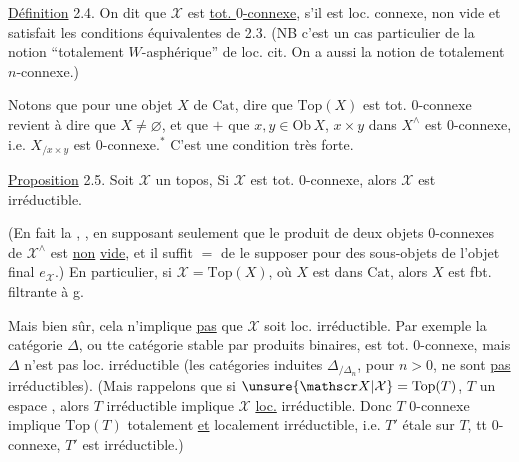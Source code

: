 
\uline{Définition} 2.4. On dit que $\mathscr X$ est \uline{tot. $0$-connexe}, s'il est  loc. connexe, non vide et satisfait les conditions équivalentes de 2.3. (NB c'est un cas particulier de la notion ``totalement $W$-asphérique'' de loc. cit. On a aussi la notion de totalement $n$-connexe.)

Notons que pour une  objet $X$ de $\mathrm{Cat}$, dire que $\mathrm{Top}(X)$ est tot. $0$-connexe revient à dire que $X\ne\varnothing$, et que $+$ que $x,y\in\mathrm{Ob}\,X$, $x\times y$ dans $X^{\wedge}$ est $0$-connexe, i.e. $X_{/x\times y}$ est $0$-connexe.$^{*}$ C'est une condition très forte.



\uline{Proposition} 2.5. Soit $\mathscr X$ un topos,  Si $\mathscr X$ est tot. $0$-connexe, alors $\mathscr X$ est irréductible. 

(En fait la  , , en supposant seulement que le produit de deux objets $0$-connexes de $\mathscr X^{\wedge}$ est \uline{non} \uline{vide}, et il suffit $=$ de le supposer pour des sous-objets de l'objet final $e_{\mathscr X}$.) En particulier, si $\mathscr X=\mathrm{Top}(X)$, où $X$ est dans $\mathrm{Cat}$, alors $X$ est fbt. filtrante à g.

Mais  bien sûr,  cela n'implique \uline{pas} que $\mathscr X$ soit loc. irréductible.
Par exemple la catégorie $\Delta$, ou tte  catégorie stable par produits binaires, est tot. $0$-connexe, mais $\Delta$ n'est pas loc.  irréductible (les catégories induites $\Delta_{/\Delta_n}$, pour $n>0$, ne sont  \uline{pas} irréductibles). (Mais rappelons que  si $\unsure{\mathscr X|\mathcal X}=\mathrm{Top}(T)$, $T$ un espace , alors $T$ irréductible implique $\mathscr X$ \uline{loc.} irréductible. Donc $T$  $0$-connexe implique $\mathrm{Top}(T)$ totalement \uline{et} localement irréductible, i.e.  $T'$ étale sur $T$, tt $0$-connexe, $T'$ est irréductible.)

